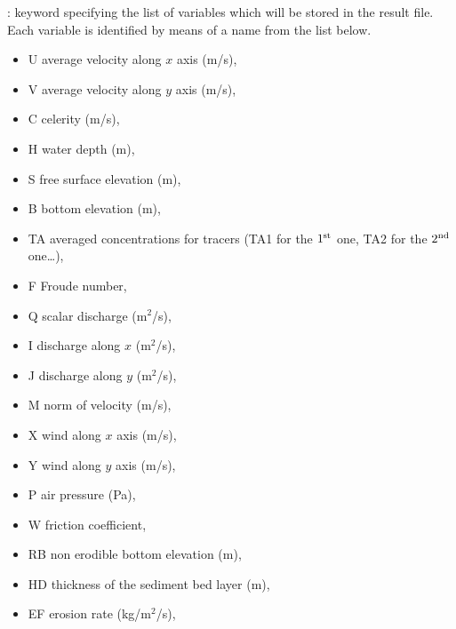 : keyword specifying the list of
variables which will be stored in the result file. Each variable is identified
by means of a name from the list below.

\begin{itemize}
\item U average velocity along $x$ axis (m/s),

\item V average velocity along $y$ axis (m/s),

\item C celerity (m/s),

\item H water depth (m),

\item S free surface elevation (m),

\item B bottom elevation (m),

\item TA averaged concentrations for tracers (TA1 for the ${1}^{\rm{st}}$ one, TA2 for the
${2}^{\rm{nd}}$ one\dots ),

\item F Froude number,

\item Q scalar discharge (m${}^{2}$/s),

\item I discharge along $x$ (m${}^{2}$/s),

\item J discharge along $y$ (m${}^{2}$/s),

\item M norm of velocity (m/s),

\item X wind along $x$ axis (m/s),

\item Y wind along $y$ axis (m/s),

\item P air pressure (Pa),

\item W friction coefficient,

\item RB non erodible bottom elevation (m),

\item HD thickness of the sediment bed layer (m),

\item EF erosion rate (kg/m${}^{2}$/s),


\end{itemize}
